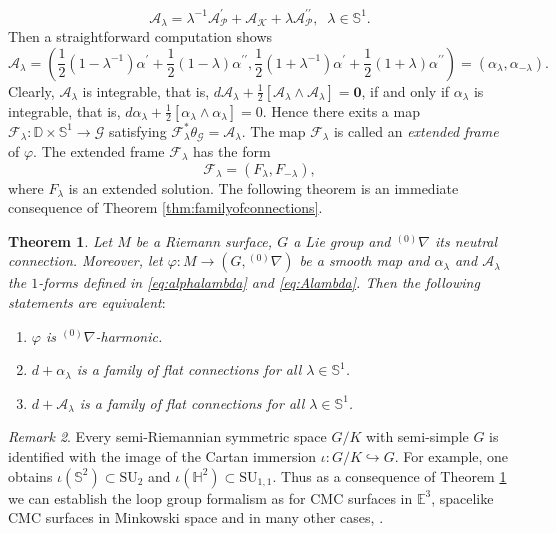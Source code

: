 \documentclass[12pt]{amsart}
\newtheorem{Theorem}{Theorem}[section]
\theoremstyle{definition}
\theoremstyle{remark}
\newtheorem{Remark}[Theorem]{Remark}
\numberwithin{equation}{section}
\begin{document}
\begin{equation}\label{eq:Alambda}
 {\mathcal A}_{\lambda} = 
  \lambda^{-1} {\mathcal A}_{\mathcal P}^{\prime} 
 + {\mathcal A}_{\mathcal K} 
 + \lambda {\mathcal A}_{\mathcal P}^{\prime \prime}, \;\;\lambda \in \mathbb S^1.
\end{equation}
 Then a straightforward computation shows 
\begin{equation}\label{eq:Alambda2}
 {\mathcal A}_{\lambda} = 
 \left(
  \frac{1}{2}(1-{\lambda}^{-1}) \alpha^{\prime} 
  +\frac{1}{2}(1-{\lambda}) \alpha^{\prime \prime}, 
  \frac{1}{2}(1+{\lambda}^{-1}) \alpha^{\prime} 
  +\frac{1}{2}(1+{\lambda}) \alpha^{\prime \prime}
  \right)
  =(\alpha_{\lambda},\alpha_{-{\lambda}}).
\end{equation}
 Clearly, ${\mathcal A}_{\lambda}$ is integrable, that is, 
 $d {\mathcal A}_{\lambda} + \tfrac{1}{2}[{\mathcal A}_{\lambda} \wedge {\mathcal A}_{\lambda}] 
 =\mathbf 0$, if and only if $\alpha_{\lambda}$ is 
 integrable, that is, $d \alpha_{\lambda} + \tfrac{1}{2}[\alpha_{\lambda} 
 \wedge \alpha_{\lambda}] =0$. 
 Hence there exits a map 
 $\mathcal{F}_{\lambda}:\mathbb{D}\times\mathbb{S}^1\to \mathcal{G}$ 
 satisfying $\mathcal{F}_{\lambda}^{*}
 \theta_\mathcal{G}=\mathcal{A}_\lambda$. The map 
 $\mathcal{F}_\lambda$ is called an \textit{extended frame} of $\varphi$. 
 The extended frame $\mathcal{F}_{\lambda}$ has the form 
\begin{equation*}
 \mathcal{F}_{\lambda}=(F_{\lambda},F_{-{\lambda}}),
\end{equation*}
 where $F_{\lambda}$ is an extended solution.
 The following theorem is an immediate consequence 
 of Theorem \ref{thm:familyofconnections}.
\begin{Theorem}\label{thm:Alambda}
 Let $M$ be a Riemann surface, $G$
 a Lie group and ${{}^{(0)}\nabla}$ its neutral connection.
 Moreover, let $\varphi : M \to 
 (G, {{}^{(0)}\nabla})$ be a smooth map and $\alpha_{\lambda}$ and 
 $\mathcal A_{\lambda}$ the $1$-forms defined in \eqref{eq:alphalambda} 
 and \eqref{eq:Alambda}.
 Then the following statements are equivalent$:$
\begin{enumerate}
 \item $\varphi$ is ${{}^{(0)}\nabla}$-harmonic. 
 \item $d + \alpha_{\lambda}$ is a family of flat connections 
 for all $\lambda \in \mathbb S^1$.
 \item $d + {\mathcal A}_{\lambda}$ is a family of flat connections 
 for all $\lambda \in \mathbb S^1$.
\end{enumerate}
\end{Theorem}
\begin{Remark}
 Every semi-Riemannian symmetric space $G/K$ with 
 semi-simple $G$ is identified with the image of 
 the Cartan immersion $\iota: G/K  \hookrightarrow G$.
 For example, one obtains $\iota (\mathbb S^2) \subset \mathrm{SU}_2$ 
 and $\iota(\mathbb H^2) \subset \mathrm{SU}_{1, 1}$. 
 Thus as a consequence of Theorem \ref{thm:Alambda} 
 we can establish the loop 
 group formalism as for CMC surfaces in $\mathbb E^3$,
 spacelike CMC surfaces in Minkowski space and 
 in many other cases, \cite{Dorfmeister}. 
\end{Remark}
\end{document}
